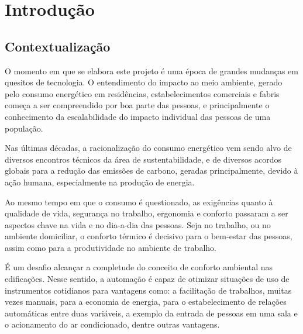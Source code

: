 
\chapter{Introdução}

\label{CapIntro}


\section{Contextualização}

O momento em que se elabora este projeto é uma época de grandes mudanças em quesitos de tecnologia. O entendimento do impacto ao meio ambiente, gerado pelo consumo energético em residências, estabelecimentos comerciais e fabris começa a ser compreendido por boa parte das pessoas, e principalmente o conhecimento da escalabilidade do impacto individual das pessoas de uma população.

Nas últimas décadas, a racionalização do consumo energético vem sendo alvo de diversos encontros técnicos da área de sustentabilidade, e de diversos acordos globais para a redução das emissões de carbono, geradas principalmente, devido à ação humana, especialmente na produção de energia.

Ao mesmo tempo em que o consumo é questionado, as exigências quanto à qualidade de vida, segurança no trabalho, ergonomia e conforto passaram a ser aspectos chave na vida e no dia-a-dia das pessoas. Seja no trabalho, ou no ambiente domiciliar, o conforto térmico é decisivo para o bem-estar das pessoas, assim como para a produtividade no ambiente de trabalho.

É um desafio alcançar a completude do conceito de conforto ambiental nas edificações. Nesse sentido, a automação é capaz de otimizar situações de uso de instrumentos cotidianos para vantagens como: a facilitação de trabalhos, muitas vezes manuais, para a economia de energia, para o estabelecimento de relações automáticas entre duas variáveis, a exemplo da entrada de pessoas em uma sala e o acionamento do ar condicionado, dentre outras vantagens.

